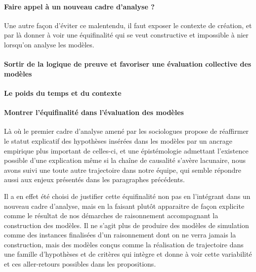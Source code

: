 \paragraph{Faire appel à un nouveau cadre d'analyse ?}
\label{p:cadre_analyse}


Une autre façon d'éviter ce malentendu, il faut exposer le contexte de création, et par là donner à voir une équifinalité qui se veut constructive et impossible à nier lorsqu'on analyse les modèles.

\paragraph{Sortir de la logique de preuve et favoriser une évaluation collective des modèles}
\label{p:preuve}



\paragraph{Le poids du temps et du contexte }
\label{p:poids}



\paragraph{Montrer l'équifinalité dans l'évaluation des modèles}
\label{p:nvlle_equifinalite}

Là où le premier cadre d'analyse amené par les sociologues propose de réaffirmer le statut explicatif des hypothèses insérées dans les modèles par un ancrage empirique plus important de celles-ci, et une épistémologie admettant l'existence possible d'une explication même si la chaîne de causalité s'avère lacunaire, nous avons suivi une toute autre trajectoire dans notre équipe, qui semble répondre aussi aux enjeux présentés dans les paragraphes précédents.

Il a en effet été choisi de justifier cette équifinalité non pas en l'intégrant dans un nouveau cadre d'analyse, mais en la faisant plutôt apparaitre de façon explicite comme le résultat de nos démarches de raisonnement accompagnant la construction des modèles. Il ne s'agit plus de produire des modèles de simulation comme des instances finalisées d'un raisonnement dont on ne verra jamais la construction, mais des modèles conçus comme la réalisation de trajectoire dans une famille d'hypothèses et de critères qui intègre et donne à voir cette variabilité et ces aller-retours possibles dans les propositions.

